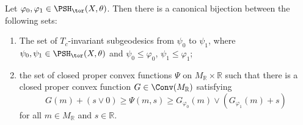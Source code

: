 \begin{corollary}\label{cor:geodG}
    Let $\varphi_0,\varphi_1\in \PSH_{\tor}(X,\theta)$. Then there is a canonical bijection between the following sets:
    \begin{enumerate}
        \item\label{itm:cor:geodG:1} The set of $T_c$-invariant subgeodesics from $\psi_0$ to $\psi_1$, where $\psi_0,\psi_1\in \PSH_{\tor}(X,\theta)$ and $\psi_0\leq \varphi_0$, $\psi_1\leq \varphi_1$;
        \item\label{itm:cor:geodG:2} the set of closed proper convex functions $\Psi$ on $M_{\mathbb{R}}\times \mathbb{R}$ such that there is a closed proper convex function $G\in \Conv(M_{\mathbb{R}})$ satisfying
        \begin{equation}\label{eq:Psilower}
        G(m)+(s\lor 0)\geq \Psi(m,s)\geq G_{\varphi_0}(m)\lor \left( G_{\varphi_1}(m)+s \right)
        \end{equation}
        for all $m\in M_{\mathbb{R}}$ and $s\in \mathbb{R}$.
    \end{enumerate}
\end{corollary}
